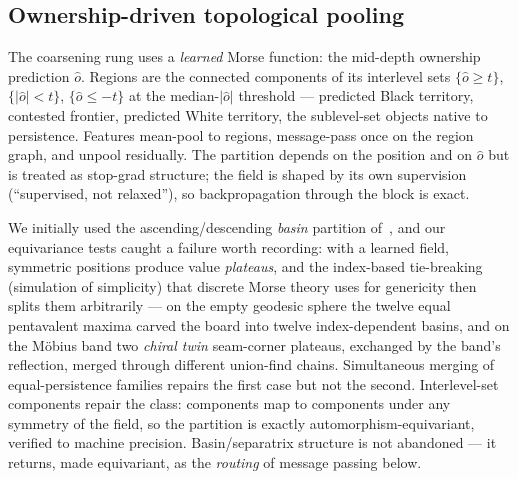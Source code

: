\documentclass[11pt]{article}
\begin{document}
\subsection{Ownership-driven topological pooling}
\label{sec:msc}
The coarsening rung uses a \emph{learned} Morse function: the mid-depth
ownership prediction $\hat o$. Regions are the connected components of
its interlevel sets $\{\hat o \ge t\}$, $\{|\hat o| < t\}$,
$\{\hat o \le -t\}$ at the median-$|\hat o|$ threshold --- predicted
Black territory, contested frontier, predicted White territory, the
sublevel-set objects native to persistence. Features mean-pool to
regions, message-pass once on the region graph, and unpool residually.
The partition depends on the position and on $\hat o$ but is treated as
stop-grad structure; the field is shaped by its own supervision
(``supervised, not relaxed''), so backpropagation through the block is
exact.

We initially used the ascending/descending \emph{basin} partition
of~\cite{leventhal2022}, and our equivariance tests caught a failure
worth recording: with a learned field, symmetric positions produce
value \emph{plateaus}, and the index-based tie-breaking (simulation of
simplicity) that discrete Morse theory uses for genericity then splits
them arbitrarily --- on the empty geodesic sphere the twelve equal
pentavalent maxima carved the board into twelve index-dependent basins,
and on the M\"obius band two \emph{chiral twin} seam-corner plateaus,
exchanged by the band's reflection, merged through different union-find
chains. Simultaneous merging of equal-persistence families repairs the
first case but not the second. Interlevel-set components repair the
class: components map to components under any symmetry of the field, so
the partition is exactly automorphism-equivariant, verified to machine
precision. Basin/separatrix structure is not abandoned --- it returns,
made equivariant, as the \emph{routing} of message passing below.
\end{document}
